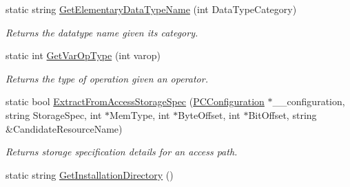 \begin{DoxyCompactItemize}
static string \hyperlink{classpc__emulator_1_1Utils_a2df4a10dd90a5aa26ac6dbcfa8384103}{Get\+Elementary\+Data\+Type\+Name} (int Data\+Type\+Category)
\begin{DoxyCompactList}\small\item\em Returns the datatype name given its category. \end{DoxyCompactList}\item 
static int \hyperlink{classpc__emulator_1_1Utils_a5273a26af3ce5b020fa6ea07e6b42eb1}{Get\+Var\+Op\+Type} (int varop)
\begin{DoxyCompactList}\small\item\em Returns the type of operation given an operator. \end{DoxyCompactList}\item 
static bool \hyperlink{classpc__emulator_1_1Utils_a6fbc2a560927d70207c6abdcf30c1975}{Extract\+From\+Access\+Storage\+Spec} (\hyperlink{classpc__emulator_1_1PCConfiguration}{P\+C\+Configuration} $\ast$\+\_\+\+\_\+configuration, string Storage\+Spec, int $\ast$Mem\+Type, int $\ast$Byte\+Offset, int $\ast$Bit\+Offset, string \&Candidate\+Resource\+Name)
\begin{DoxyCompactList}\small\item\em Returns storage specification details for an access path. \end{DoxyCompactList}\item 
static string \hyperlink{classpc__emulator_1_1Utils_aecb9549cd527314bcb8c3f03469da10a}{Get\+Installation\+Directory} ()\hypertarget{classpc__emulator_1_1Utils_aecb9549cd527314bcb8c3f03469da10a}{}\label{classpc__emulator_1_1Utils_aecb9549cd527314bcb8c3f03469da10a}


\end{DoxyCompactItemize}
